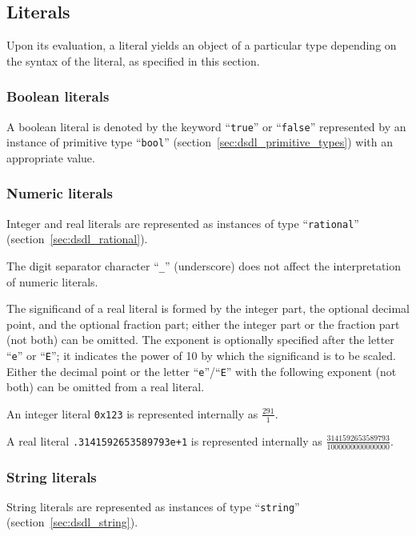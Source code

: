 \subsection{Literals}

Upon its evaluation, a literal yields an object of a particular type depending on the syntax of the literal,
as specified in this section.

\subsubsection{Boolean literals}

A boolean literal is denoted by the keyword ``\verb|true|'' or ``\verb|false|''
represented by an instance of primitive type ``\verb|bool|'' (section~\ref{sec:dsdl_primitive_types})
with an appropriate value.

\subsubsection{Numeric literals}

Integer and real literals are represented as instances of type ``\verb|rational|'' (section~\ref{sec:dsdl_rational}).

The digit separator character ``\verb|_|'' (underscore) does not affect the interpretation of numeric literals.

The significand of a real literal is formed by the integer part, the optional decimal point,
and the optional fraction part;
either the integer part or the fraction part (not both) can be omitted.
The exponent is optionally specified after the letter ``\verb|e|'' or ``\verb|E|'';
it indicates the power of 10 by which the significand is to be scaled.
Either the decimal point or the letter ``\verb|e|''/``\verb|E|'' with the following exponent
(not both) can be omitted from a real literal.

\begin{remark}
    An integer literal \verb|0x123| is represented internally as $\frac{291}{1}$.

    A real literal \verb|.3141592653589793e+1| is represented internally as
    $\frac{3141592653589793}{1000000000000000}$.
\end{remark}

\subsubsection{String literals}

String literals are represented as instances of type ``\verb|string|'' (section~\ref{sec:dsdl_string}).

